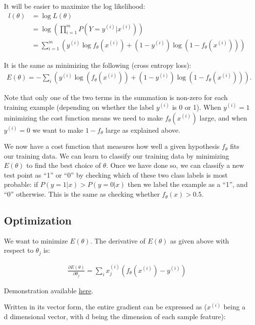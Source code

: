 It will be easier to maximize the log likelihood:
\begin{align}
	l(\theta) &= \log L(\theta) \\
			  &= \log \left( \prod_{i=1}^m P(Y=y^{(i)} | x^{(i)}) \right) \\
			  &= \sum_{i=1}^m \left( y^{(i)}\log f_\theta(x^{(i)}) + (1-y^{(i)})\log (1 - f_\theta(x^{(i)})) \right)
\end{align}

It is the same as minimizing the following (cross entropy loss):
\begin{align}
	E(\theta) = - \sum_i \left(y^{(i)} \log( f_\theta(x^{(i)}) ) + (1 - y^{(i)}) \log( 1 - f_\theta(x^{(i)}) ) \right).
\end{align}


Note that only one of the two terms in the summation is non-zero for each training example (depending on whether the label $y^{(i)}$ is 0 or 1). When $y^{(i)} = 1$ minimizing the cost function means we need to make $f_\theta(x^{(i)})$ large, and when $y^{(i)} = 0$ we want to make $1 - f_\theta$ large as explained above.

We now have a cost function that measures how well a given hypothesis $f_\theta$ fits our training data. We can learn to classify our training data by minimizing $E(\theta)$ to find the best choice of $\theta$. Once we have done so, we can classify a new test point as “1” or “0” by checking which of these two class labels is most probable: if $P(y=1|x) > P(y=0|x)$ then we label the example as a “1”, and “0” otherwise. This is the same as checking whether $f_\theta(x) > 0.5$.

\subsection{Optimization}
We want to minimize $E(\theta)$. The derivative of $E(\theta)$ as given above with respect to $\theta_j$ is:

\begin{align}
	\frac{\partial E(\theta)}{\partial \theta_j} = \sum_i x^{(i)}_j (f_\theta(x^{(i)}) - y^{(i)})
\end{align}

Demonstration available \href{https://math.stackexchange.com/questions/477207/derivative-of-cost-function-for-logistic-regression}{here}.

Written in its vector form, the entire gradient can be expressed as ($x^{(i)}$ being a d dimensional vector, with d being the dimension of each sample feature):

